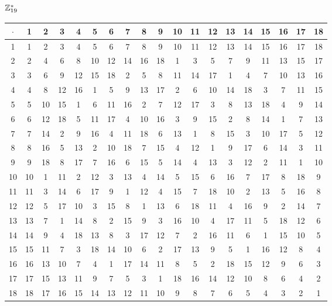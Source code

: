 \subsubsection{$\mathbb{Z}_{19}^*$}
\begin{tabular}{|c|c|c|c|c|c|c|c|c|c|c|c|c|c|c|c|c|c|c|}
\hline $\cdot$  & 1 & 2 & 3 & 4 & 5 & 6 & 7 & 8 & 9 & 10 & 11 & 12 & 13 & 14 & 15 & 16 & 17 & 18\\
\hline 1 & 1 & 2 & 3 & 4 & 5 & 6 & 7 & 8 & 9 & 10 & 11 & 12 & 13 & 14 & 15 & 16 & 17 & 18\\
\hline 2 & 2 & 4 & 6 & 8 & 10 & 12 & 14 & 16 & 18 & 1 & 3 & 5 & 7 & 9 & 11 & 13 & 15 & 17\\
\hline 3 & 3 & 6 & 9 & 12 & 15 & 18 & 2 & 5 & 8 & 11 & 14 & 17 & 1 & 4 & 7 & 10 & 13 & 16\\
\hline 4 & 4 & 8 & 12 & 16 & 1 & 5 & 9 & 13 & 17 & 2 & 6 & 10 & 14 & 18 & 3 & 7 & 11 & 15\\
\hline 5 & 5 & 10 & 15 & 1 & 6 & 11 & 16 & 2 & 7 & 12 & 17 & 3 & 8 & 13 & 18 & 4 & 9 & 14\\
\hline 6 & 6 & 12 & 18 & 5 & 11 & 17 & 4 & 10 & 16 & 3 & 9 & 15 & 2 & 8 & 14 & 1 & 7 & 13\\
\hline 7 & 7 & 14 & 2 & 9 & 16 & 4 & 11 & 18 & 6 & 13 & 1 & 8 & 15 & 3 & 10 & 17 & 5 & 12\\
\hline 8 & 8 & 16 & 5 & 13 & 2 & 10 & 18 & 7 & 15 & 4 & 12 & 1 & 9 & 17 & 6 & 14 & 3 & 11\\
\hline 9 & 9 & 18 & 8 & 17 & 7 & 16 & 6 & 15 & 5 & 14 & 4 & 13 & 3 & 12 & 2 & 11 & 1 & 10\\
\hline 10 & 10 & 1 & 11 & 2 & 12 & 3 & 13 & 4 & 14 & 5 & 15 & 6 & 16 & 7 & 17 & 8 & 18 & 9\\
\hline 11 & 11 & 3 & 14 & 6 & 17 & 9 & 1 & 12 & 4 & 15 & 7 & 18 & 10 & 2 & 13 & 5 & 16 & 8\\
\hline 12 & 12 & 5 & 17 & 10 & 3 & 15 & 8 & 1 & 13 & 6 & 18 & 11 & 4 & 16 & 9 & 2 & 14 & 7\\
\hline 13 & 13 & 7 & 1 & 14 & 8 & 2 & 15 & 9 & 3 & 16 & 10 & 4 & 17 & 11 & 5 & 18 & 12 & 6\\
\hline 14 & 14 & 9 & 4 & 18 & 13 & 8 & 3 & 17 & 12 & 7 & 2 & 16 & 11 & 6 & 1 & 15 & 10 & 5\\
\hline 15 & 15 & 11 & 7 & 3 & 18 & 14 & 10 & 6 & 2 & 17 & 13 & 9 & 5 & 1 & 16 & 12 & 8 & 4\\
\hline 16 & 16 & 13 & 10 & 7 & 4 & 1 & 17 & 14 & 11 & 8 & 5 & 2 & 18 & 15 & 12 & 9 & 6 & 3\\
\hline 17 & 17 & 15 & 13 & 11 & 9 & 7 & 5 & 3 & 1 & 18 & 16 & 14 & 12 & 10 & 8 & 6 & 4 & 2\\
\hline 18 & 18 & 17 & 16 & 15 & 14 & 13 & 12 & 11 & 10 & 9 & 8 & 7 & 6 & 5 & 4 & 3 & 2 & 1\\
\hline
\end{tabular}



